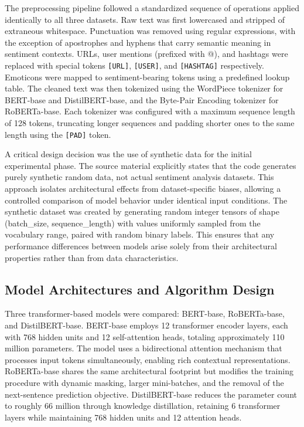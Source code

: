 \documentclass[conference]{IEEEtran}
\begin{document}
The preprocessing pipeline followed a standardized sequence of operations applied identically to all three datasets. Raw text was first lowercased and stripped of extraneous whitespace. Punctuation was removed using regular expressions, with the exception of apostrophes and hyphens that carry semantic meaning in sentiment contexts. URLs, user mentions (prefixed with @), and hashtags were replaced with special tokens \texttt{[URL]}, \texttt{[USER]}, and \texttt{[HASHTAG]} respectively. Emoticons were mapped to sentiment-bearing tokens using a predefined lookup table. The cleaned text was then tokenized using the WordPiece tokenizer for BERT-base and DistilBERT-base, and the Byte-Pair Encoding tokenizer for RoBERTa-base. Each tokenizer was configured with a maximum sequence length of 128 tokens, truncating longer sequences and padding shorter ones to the same length using the \texttt{[PAD]} token.

A critical design decision was the use of synthetic data for the initial experimental phase. The source material explicitly states that the code generates purely synthetic random data, not actual sentiment analysis datasets. This approach isolates architectural effects from dataset-specific biases, allowing a controlled comparison of model behavior under identical input conditions. The synthetic dataset was created by generating random integer tensors of shape (batch\_size, sequence\_length) with values uniformly sampled from the vocabulary range, paired with random binary labels. This ensures that any performance differences between models arise solely from their architectural properties rather than from data characteristics.

\subsection{Model Architectures and Algorithm Design}

Three transformer-based models were compared: BERT-base, RoBERTa-base, and DistilBERT-base. BERT-base employs 12 transformer encoder layers, each with 768 hidden units and 12 self-attention heads, totaling approximately 110 million parameters. The model uses a bidirectional attention mechanism that processes input tokens simultaneously, enabling rich contextual representations. RoBERTa-base shares the same architectural footprint but modifies the training procedure with dynamic masking, larger mini-batches, and the removal of the next-sentence prediction objective. DistilBERT-base reduces the parameter count to roughly 66 million through knowledge distillation, retaining 6 transformer layers while maintaining 768 hidden units and 12 attention heads.
\end{document}
